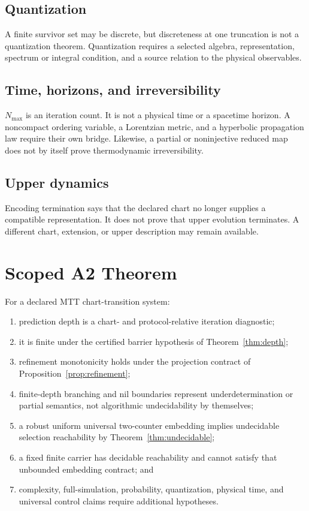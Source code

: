 \documentclass[11pt]{article}
\begin{document}
\subsection{Quantization}

A finite survivor set may be discrete, but discreteness at one truncation is
not a quantization theorem.  Quantization requires a selected algebra,
representation, spectrum or integral condition, and a source relation to the
physical observables.

\subsection{Time, horizons, and irreversibility}

$N_{\max}$ is an iteration count.  It is not a physical time or a spacetime
horizon.  A noncompact ordering variable, a Lorentzian metric, and a
hyperbolic propagation law require their own bridge.  Likewise, a partial or
noninjective reduced map does not by itself prove thermodynamic
irreversibility.

\subsection{Upper dynamics}

Encoding termination says that the declared chart no longer supplies a
compatible representation.  It does not prove that upper evolution
terminates.  A different chart, extension, or upper description may remain
available.

\section{Scoped A2 Theorem}

\begin{theorem}
\label{thm:scope}
For a declared MTT chart-transition system:
\begin{enumerate}
\item prediction depth is a chart- and protocol-relative iteration diagnostic;
\item it is finite under the certified barrier hypothesis of
Theorem~\ref{thm:depth};
\item refinement monotonicity holds under the projection contract of
Proposition~\ref{prop:refinement};
\item finite-depth branching and nil boundaries represent underdetermination
or partial semantics, not algorithmic undecidability by themselves;
\item a robust uniform universal two-counter embedding implies undecidable
selection reachability by Theorem~\ref{thm:undecidable};
\item a fixed finite carrier has decidable reachability and cannot satisfy
that unbounded embedding contract; and
\item complexity, full-simulation, probability, quantization, physical time,
and universal control claims require additional hypotheses.
\end{enumerate}
\end{theorem}
\end{document}
